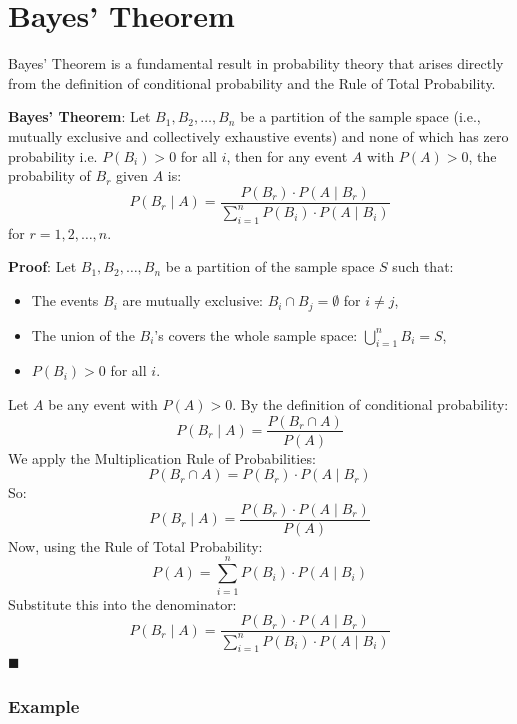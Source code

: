 \documentclass[twoside]{book}
\begin{document}
\section{Bayes' Theorem}
Bayes' Theorem is a fundamental result in probability theory that arises directly from the definition of conditional probability and the Rule of Total Probability.
\begin{textbox}
    \textbf{Bayes' Theorem}: Let \( B_1, B_2, \ldots, B_n \) be a partition of the sample space (i.e., mutually exclusive and collectively exhaustive events) and none of which has zero probability i.e. \( P(B_i) > 0 \) for all \( i \), then for any event \( A \) with \( P(A) > 0 \), the probability of \( B_r \) given \( A \) is:
\[
P(B_r \mid A) = \frac{P(B_r) \cdot P(A \mid B_r)}{\sum_{i=1}^{n} P(B_i) \cdot P(A \mid B_i)}
\]
for \( r = 1, 2, \ldots, n \).
\end{textbox}
\textbf{Proof}: Let \( B_1, B_2, \ldots, B_n \) be a partition of the sample space \( S \) such that:
\begin{itemize}
    \item The events \( B_i \) are mutually exclusive: \( B_i \cap B_j = \emptyset \) for \( i \neq j \),
    \item The union of the \( B_i \)'s covers the whole sample space: \( \bigcup_{i=1}^n B_i = S \),
    \item \( P(B_i) > 0 \) for all \( i \).
\end{itemize}

Let \( A \) be any event with \( P(A) > 0 \). By the definition of conditional probability:
\[
P(B_r \mid A) = \frac{P(B_r \cap A)}{P(A)}
\]
We apply the Multiplication Rule of Probabilities:
\[
P(B_r \cap A) = P(B_r) \cdot P(A \mid B_r)
\]
So:
\[
P(B_r \mid A) = \frac{P(B_r) \cdot P(A \mid B_r)}{P(A)}
\]
Now, using the Rule of Total Probability:
\[
P(A) = \sum_{i=1}^n P(B_i) \cdot P(A \mid B_i)
\]
Substitute this into the denominator:
\[
P(B_r \mid A) = \frac{P(B_r) \cdot P(A \mid B_r)}{\sum_{i=1}^{n} P(B_i) \cdot P(A \mid B_i)}
\]
\hfill\(\blacksquare\)

\subsubsection{Example}
\end{document}
